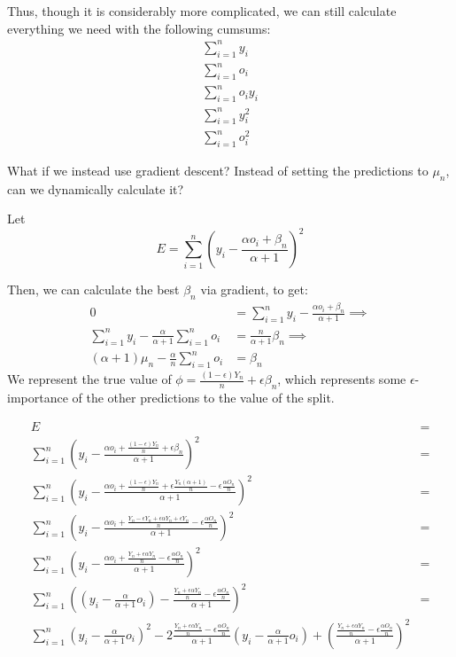 \documentclass{article}
\begin{document}
Thus, though it is considerably more complicated, we can still calculate everything we need with the following cumsums:
\begin{align*}
    \sum_{i=1}^{n} y_i \\
    \sum_{i=1}^{n} o_i \\
    \sum_{i=1}^{n} o_i y_i \\
    \sum_{i=1}^{n} y_i^2 \\
    \sum_{i=1}^{n} o_i^2 
\end{align*}

What if we instead use gradient descent? Instead of setting the predictions to $\mu_n$, 
can we dynamically calculate it?

Let \[
E = \sum_{i=1}^n (y_i - \frac{\alpha o_i + \beta_n}{\alpha + 1})^2 
\]   

Then, we can calculate the best $\beta_n$ via gradient, to get:
\begin{align*}
    0 &= \sum_{i=1}^n y_i - \frac{\alpha o_i + \beta_n}{\alpha + 1} \implies \\
    \sum_{i=1}^n y_i - \frac{\alpha}{\alpha + 1} \sum_{i=1}^{n} o_i &= \frac{n}{\alpha + 1}\beta_n  \implies \\
    (\alpha + 1)\mu_n - \frac{\alpha}{n} \sum_{i=1}^{n} o_i &= \beta_n
\end{align*}
We represent the true value of $\phi = \frac{(1 - \epsilon)Y_n}{n} + \epsilon \beta_n$, which represents some $\epsilon$-importance of the 
other predictions to the value of the split.

\begin{align*}
    E &= \\
    \sum_{i=1}^n \left(y_i - \frac{\alpha o_i + \frac{(1 - \epsilon)Y_n}{n} + \epsilon \beta_n}{\alpha + 1} \right)^2 &= \\
    \sum_{i=1}^n \left(y_i - \frac{\alpha o_i + \frac{(1 - \epsilon)Y_n}{n} + \epsilon \frac{Y_n(\alpha + 1)}{n} - \epsilon \frac{\alpha O_n}{n}}{\alpha + 1} \right)^2 &= \\
    \sum_{i=1}^n \left(y_i - \frac{\alpha o_i + \frac{Y_n - \epsilon Y_n + \epsilon \alpha Y_n + \epsilon Y_n}{n} - \epsilon \frac{\alpha O_n}{n}}{\alpha + 1} \right)^2 &= \\
    \sum_{i=1}^n \left(y_i - \frac{\alpha o_i + \frac{Y_n + \epsilon \alpha Y_n}{n} - \epsilon \frac{\alpha O_n}{n}}{\alpha + 1} \right)^2 &= \\
    \sum_{i=1}^n \left(\left(y_i - \frac{\alpha}{\alpha + 1}o_i\right) - \frac{\frac{Y_n + \epsilon \alpha Y_n}{n} - \epsilon \frac{\alpha O_n}{n}}{\alpha + 1} \right)^2 &= \\
    \sum_{i=1}^n \left(y_i - \frac{\alpha}{\alpha + 1}o_i\right)^2 - 2\frac{\frac{Y_n + \epsilon \alpha Y_n}{n} - \epsilon \frac{\alpha O_n}{n}}{\alpha + 1}\left(y_i - \frac{\alpha}{\alpha + 1}o_i\right) + \left( \frac{\frac{Y_n + \epsilon \alpha Y_n}{n} - \epsilon \frac{\alpha O_n}{n}}{\alpha + 1}\right)^2
\end{align*}
\end{document}
